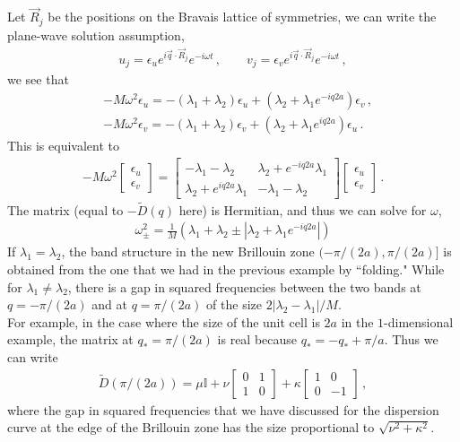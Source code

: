 \documentclass[11pt, oneside]{book}
\theoremstyle{break}
\theoremstyle{break}
\newcommand{\that}[1]{\widetilde{#1}}
\newcommand{\bmat}[1]{\begin{bmatrix} #1 \end{bmatrix}}
\begin{document}
Let $\vec{R}_j $ be the positions on the Bravais lattice of symmetries, we can write the plane-wave solution assumption, 
\begin{align*}
u_j = \epsilon_u e^{i\vec{q}\cdot \vec{R}_j} e^{-i\omega t}\,,\qquad
v_j = \epsilon_v e^{i\vec{q}\cdot \vec{R}_j} e^{-i\omega t}\,,
\end{align*}
we see that 
\begin{align*}
&-M \omega^2 \epsilon_u = -(\lambda_1 + \lambda_2) \epsilon_u + (\lambda_2  +\lambda_1e^{-iq2a})\epsilon_v\,,\\
&-M \omega^2 \epsilon_v = -(\lambda_1 + \lambda_2) \epsilon_v + (\lambda_2 + \lambda_1e^{iq2a})\epsilon_u\,.
\end{align*}
This is equivalent to 
\begin{align*}
-M\omega^2\bmat{\epsilon_u\\\epsilon_v} = \bmat{-\lambda_1 - \lambda_2 & \lambda_2 + e^{-iq2a}\lambda_1 \\ \lambda_2 + e^{iq2a}\lambda_1 & -\lambda_1 -\lambda_2}\bmat{\epsilon_u \\ \epsilon_v}\,.
\end{align*}
The matrix (equal to $-\that{D}(q)$ here) is Hermitian, and thus we can solve for $\omega$,
\begin{align*}
\omega_{\pm}^2 = \frac{1}{M}\left( \lambda_1 + \lambda_2 \pm \left|\lambda_2 + \lambda_1 e^{-iq2a}\right|\right)
\end{align*}
If $\lambda_1 = \lambda_2$, the band structure in the new Brillouin zone $(-\pi/(2a), \pi/(2a)]$ is obtained from the one that we had in the previous example by ``folding." While for $\lambda_1 \neq \lambda_2$, there is a gap in squared frequencies between the two bands at $q = -\pi/(2a)$ and at $q = \pi/(2a)$ of the size $2|\lambda_2 - \lambda_1|/M$. \\

For example, in the case where the size of the unit cell is $2a$ in the $1$-dimensional example, the matrix at $q_*=\pi/(2a)$ is real because $q_*=-q_*+\pi/a$. Thus we can write 
\begin{align*}
\that{D} ( \pi/(2a)) = \mu \mathbb{I} + \nu \bmat{0 & 1 \\ 1 & 0} + \kappa \bmat{1 & 0 \\ 0 & -1}\,,
\end{align*}
where the gap in squared frequencies that we have discussed for the dispersion curve at the edge of the Brillouin zone has the size proportional to $\sqrt{\nu^2 + \kappa^2}$.
\end{document}

